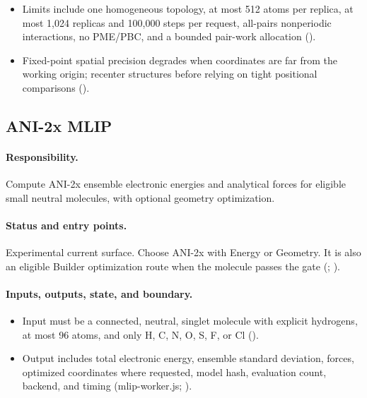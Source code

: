 \documentclass[11pt]{article}
\begin{document}
\begin{small}
\begin{itemize}[leftmargin=*]
\item Limits include one homogeneous topology, at most 512 atoms per replica, at most 1,024 replicas and 100,000 steps per request, all-pairs nonperiodic interactions, no PME/PBC, and a bounded pair-work allocation ().

\item Fixed-point spatial precision degrades when coordinates are far from the working origin; recenter structures before relying on tight positional comparisons ().

\end{itemize}

\subsection{ANI-2x MLIP}\label{appB:sec14}

\paragraph{Responsibility.}

Compute ANI-2x ensemble electronic energies and analytical forces for eligible small neutral molecules, with optional geometry optimization.

\paragraph{Status and entry points.}

Experimental current surface. Choose ANI-2x with Energy or Geometry. It is also an eligible Builder optimization route when the molecule passes the gate (; ).

\paragraph{Inputs, outputs, state, and boundary.}

\begin{itemize}[leftmargin=*]

\item Input must be a connected, neutral, singlet molecule with explicit hydrogens, at most 96 atoms, and only H, C, N, O, S, F, or Cl ().

\item Output includes total electronic energy, ensemble standard deviation, forces, optimized coordinates where requested, model hash, evaluation count, backend, and timing (mlip-worker.js; ).


\end{itemize}
\end{small}
\end{document}
